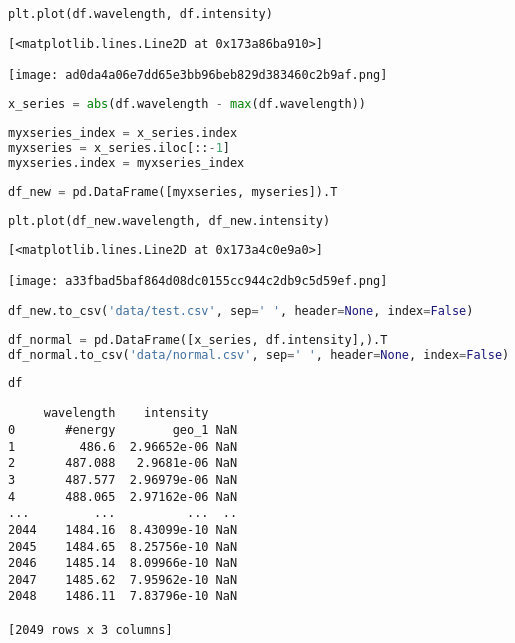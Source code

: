 \begin{lstlisting}[language=Python]
plt.plot(df.wavelength, df.intensity)
\end{lstlisting}

\begin{lstlisting}
[<matplotlib.lines.Line2D at 0x173a86ba910>]
\end{lstlisting}

\texttt{[image: ad0da4a06e7dd65e3bb96beb829d383460c2b9af.png]}

\begin{lstlisting}[language=Python]
x_series = abs(df.wavelength - max(df.wavelength))
\end{lstlisting}

\begin{lstlisting}[language=Python]
myxseries_index = x_series.index
myxseries = x_series.iloc[::-1]
myxseries.index = myxseries_index
\end{lstlisting}

\begin{lstlisting}[language=Python]
df_new = pd.DataFrame([myxseries, myseries]).T
\end{lstlisting}

\begin{lstlisting}[language=Python]
plt.plot(df_new.wavelength, df_new.intensity)
\end{lstlisting}

\begin{lstlisting}
[<matplotlib.lines.Line2D at 0x173a4c0e9a0>]
\end{lstlisting}

\texttt{[image: a33fbad5baf864d08dc0155cc944c2db9c5d59ef.png]}

\begin{lstlisting}[language=Python]
df_new.to_csv('data/test.csv', sep=' ', header=None, index=False)
\end{lstlisting}

\begin{lstlisting}[language=Python]
df_normal = pd.DataFrame([x_series, df.intensity],).T
df_normal.to_csv('data/normal.csv', sep=' ', header=None, index=False)
\end{lstlisting}

\begin{lstlisting}[language=Python]
df
\end{lstlisting}

\begin{lstlisting}
     wavelength    intensity    
0       #energy        geo_1 NaN
1         486.6  2.96652e-06 NaN
2       487.088   2.9681e-06 NaN
3       487.577  2.96979e-06 NaN
4       488.065  2.97162e-06 NaN
...         ...          ...  ..
2044    1484.16  8.43099e-10 NaN
2045    1484.65  8.25756e-10 NaN
2046    1485.14  8.09966e-10 NaN
2047    1485.62  7.95962e-10 NaN
2048    1486.11  7.83796e-10 NaN

[2049 rows x 3 columns]
\end{lstlisting}

